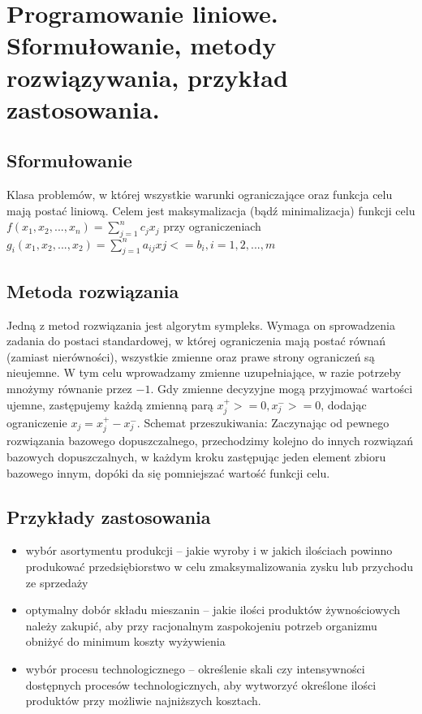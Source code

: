 \section{Programowanie liniowe. Sformułowanie, metody rozwiązywania, przykład zastosowania.}

	\subsection{Sformułowanie}
	Klasa problemów, w której wszystkie warunki ograniczające oraz funkcja celu mają postać liniową.
	Celem jest maksymalizacja (bądź minimalizacja) funkcji celu
	$f(x_{1},x_{2},...,x_{n})=\sum\limits_{j=1}^n c_{j}x_{j}$
	przy ograniczeniach 
	$g_{i}(x_{1},x_{2},...,x_{2})=\sum\limits_{j=1}^n a_{ij}x{j}<=b_{i}, i=1,2,...,m$
		
		
	\subsection{Metoda rozwiązania}
	Jedną z metod rozwiązania jest algorytm sympleks. Wymaga on sprowadzenia zadania do postaci standardowej, w której ograniczenia mają postać równań (zamiast nierówności), wszystkie zmienne oraz prawe strony ograniczeń są nieujemne. W tym celu wprowadzamy zmienne uzupełniające, w razie potrzeby mnożymy równanie przez $-1$. Gdy zmienne decyzyjne mogą przyjmować wartości ujemne, zastępujemy każdą zmienną parą $x_{j}^{+}>=0, x_{j}^{-}>=0$, dodając ograniczenie $x_{j}=x_{j}^{+}-x_{j}^{-}$.
	Schemat przeszukiwania:
Zaczynając od pewnego rozwiązania bazowego dopuszczalnego, przechodzimy kolejno do innych rozwiązań bazowych dopuszczalnych, w każdym kroku zastępując jeden element zbioru bazowego innym, dopóki da się pomniejszać wartość funkcji celu.
	\subsection{Przykłady zastosowania}
\begin{itemize}
\item wybór asortymentu produkcji – jakie wyroby i w jakich ilościach powinno produkować przedsiębiorstwo w celu zmaksymalizowania zysku lub przychodu ze sprzedaży
\item optymalny dobór składu mieszanin – jakie ilości produktów żywnościowych należy zakupić, aby przy racjonalnym zaspokojeniu potrzeb organizmu obniżyć do minimum koszty wyżywienia
\item wybór procesu technologicznego – określenie skali czy intensywności dostępnych procesów technologicznych, aby wytworzyć określone ilości produktów przy możliwie najniższych kosztach.
\end{itemize}
